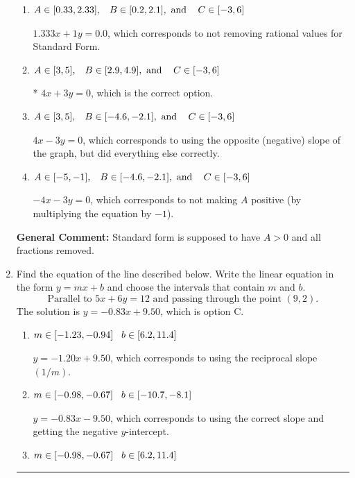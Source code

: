 \documentclass{extbook}[14pt]
\newcommand{\litem}[1]{\item #1

\rule{\textwidth}{0.4pt}}
\begin{document}
\begin{enumerate}
{\begin{enumerate}[label=\Alph*.]
 $1.333x - 1y = -0.0$, which corresponds to using the opposite (negative) slope of the graph and not removing rational values.
\item \( A \in [0.33, 2.33], \hspace{3mm} B \in [0.2, 2.1], \text{ and } \hspace{3mm} C \in [-3, 6] \)

 $1.333x + 1y = 0.0$, which corresponds to not removing rational values for Standard Form.
\item \( A \in [3, 5], \hspace{3mm} B \in [2.9, 4.9], \text{ and } \hspace{3mm} C \in [-3, 6] \)

* $4x + 3y = 0$, which is the correct option.
\item \( A \in [3, 5], \hspace{3mm} B \in [-4.6, -2.1], \text{ and } \hspace{3mm} C \in [-3, 6] \)

 $4x - 3y = 0$, which corresponds to using the opposite (negative) slope of the graph, but did everything else correctly.
\item \( A \in [-5, -1], \hspace{3mm} B \in [-4.6, -2.1], \text{ and } \hspace{3mm} C \in [-3, 6] \)

 $-4x - 3y = 0$, which corresponds to not making $A$ positive (by multiplying the equation by $-1$).
\end{enumerate}

\textbf{General Comment:} Standard form is supposed to have $A > 0$ and all fractions removed.
}
\litem{
Find the equation of the line described below. Write the linear equation in the form $ y=mx+b $ and choose the intervals that contain $m$ and $b$.
\[ \text{Parallel to } 5 x + 6 y = 12 \text{ and passing through the point } (9, 2). \]The solution is \( y = -0.83x + 9.50 \), which is option C.\begin{enumerate}[label=\Alph*.]
\item \( m \in [-1.23, -0.94] \hspace*{3mm} b \in [6.2, 11.4] \)

 $y = -1.20x + 9.50$, which corresponds to using the reciprocal slope $(1/m)$.
\item \( m \in [-0.98, -0.67] \hspace*{3mm} b \in [-10.7, -8.1] \)

 $y = -0.83x - 9.50$, which corresponds to using the correct slope and getting the negative $y$-intercept.
\item \( m \in [-0.98, -0.67] \hspace*{3mm} b \in [6.2, 11.4] \)


\end{enumerate}}
\end{enumerate}
\end{document}
